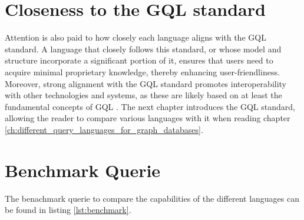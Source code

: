 \section{Closeness to the GQL standard}
\label{sec:criteria_for_comparison:iso}
Attention is also paid to how closely each language aligns with the 
GQL standard. 
A language that closely follows this standard, 
or whose model and structure incorporate a significant portion of it, 
ensures that users need to acquire minimal proprietary knowledge, 
thereby enhancing user-friendliness. 
Moreover, strong alignment with the GQL standard promotes interoperability 
with other technologies and systems, as these are likely based on at least 
the fundamental concepts of GQL \citep{hare_isoiec_2024}.
The next chapter introduces the GQL standard, allowing the reader to compare various languages with it when reading chapter 
\ref{ch:different_query_languages_for_graph_databases}.

\section{Benchmark Querie}
The benachmark querie to compare the capabilities of the different languages can be found in 
listing \ref{lst:benchmark}.

